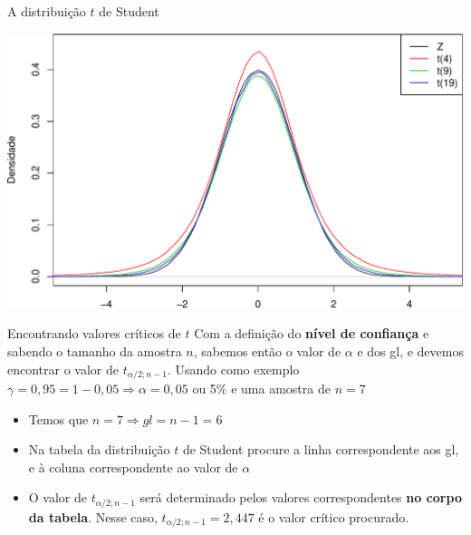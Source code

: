 \documentclass[10pt]{beamer}\usepackage[]{graphicx}\usepackage[]{color}
\newenvironment{knitrout}{}{} %
\theoremstyle{definition}
\begin{document}
\begin{frame}[fragile]{A distribuição $t$ de Student}
\begin{knitrout}\footnotesize
{}\color{fgcolor}

{\centering \includegraphics[width=1\textwidth]{figure/unnamed-chunk-5-1} 

}



\end{knitrout}
\end{frame}

\begin{frame}{Encontrando valores críticos de $t$}
  Com a definição do \textbf{nível de confiança} e sabendo o tamanho da
  amostra $n$, sabemos então o valor de $\alpha$ e dos gl, e devemos
  encontrar o valor de $t_{\alpha/2;n-1}$. Usando
  como exemplo $\gamma = 0,95 = 1 - 0,05 \Rightarrow \alpha = 0,05$ ou
  5\% e uma amostra de $n=7$
  \vspace{1em}
  \begin{itemize}
  \item Temos que $n=7 \Rightarrow gl = n-1 = 6$
  \item Na tabela da distribuição $t$ de Student procure a linha
    correspondente aos gl, e à coluna correspondente ao valor de
    $\alpha$
  \item O valor de $t_{\alpha/2;n-1}$ será determinado pelos valores
    correspondentes \textbf{no corpo da tabela}. Nesse caso,
    $t_{\alpha/2;n-1} = 2,447$ é o valor crítico procurado.
  \end{itemize}
\end{frame}
\end{document}
